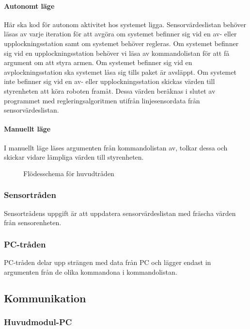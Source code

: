 \paragraph{Autonomt läge}
\leavevmode
\newline
\newline
Här ska kod för autonom aktivitet hos systemet ligga. Sensorvärdeslistan behöver läsas av varje iteration för att avgöra om systemet befinner sig vid en av- eller upplockningsstation samt om systemet behöver regleras. Om systemet befinner sig vid en upplockningsstation behöver vi läsa av kommandolistan för att få argument om att styra armen. Om systemet befinner sig vid en avplockningsstation ska systemet låsa sig tills paket är avsläppt.
\newline 
Om systemet inte befinner sig vid en av- eller upplockningsstation skickas värden till styrenheten att köra roboten framåt. Dessa värden beräknas i slutet av programmet med regleringsalgoritmen utifrån linjesensordata från sensorvärdeslistan. 
\paragraph{Manuellt läge}
\leavevmode
\newline
\newline
I manuellt läge läses argumenten från kommandolistan av, tolkar dessa och skickar vidare lämpliga värden till styrenheten.

\begin{figure}[h]
\centering
\scalebox{0.6}{}
\caption{Flödesschema för huvudtråden}
\end{figure}

\subsubsection{Sensortråden}
Sensortrådens uppgift är att uppdatera sensorvärdeslistan med fräscha värden från sensorenheten.
\subsubsection{PC-tråden}
PC-tråden delar upp strängen med data från PC och lägger endast in argumenten från de olika kommandona i kommandolistan.

\subsection{Kommunikation}
\subsubsection{Huvudmodul-PC}
